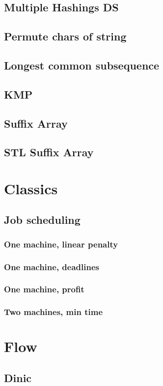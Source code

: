 \subsection{Multiple Hashings DS}
\subsection{Permute chars of string}
\subsection{Longest common subsequence}
\subsection{KMP}
\subsection{Suffix Array}
\subsection{STL Suffix Array}
\section{Classics}
\subsection{Job scheduling}
\subsubsection{One machine, linear penalty}
\subsubsection{One machine, deadlines}
\subsubsection{One machine, profit}
\subsubsection{Two machines, min time}

\section{Flow}
\subsection{Dinic}

